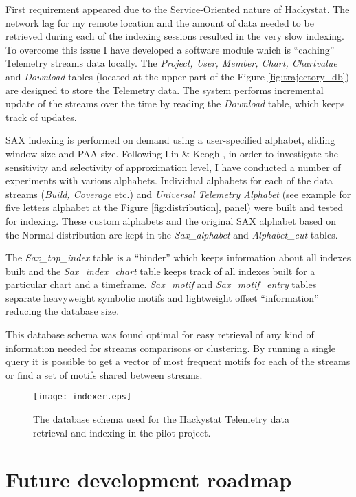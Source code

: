 First requirement appeared due to the Service-Oriented nature of Hackystat. The network lag for my remote location and the amount of data needed to be retrieved during each of the indexing sessions resulted in the very slow indexing. To overcome this issue I have developed a software module which is ``caching'' Telemetry streams data locally. The \textit{Project, User, Member, Chart, Chartvalue} and \textit{Download} tables (located at the upper part of the Figure \ref{fig:trajectory_db}) are designed to store the Telemetry data. The system performs incremental update of the streams over the time by reading the \textit{Download} table, which keeps track of updates.

SAX indexing is performed on demand using a user-specified alphabet, sliding window size and PAA size. Following Lin \& Keogh \cite{citeulike:2821475}, in order to investigate the sensitivity and selectivity of approximation level, I have conducted a number of experiments with various alphabets. Individual alphabets for each of the data streams (\textit{Build, Coverage} etc.) and \textit{Universal Telemetry Alphabet} (see example for five letters alphabet at the Figure \ref{fig:distribution}, panel) were built and tested for indexing. These custom alphabets and the original SAX alphabet based on the Normal distribution are kept in the \textit{Sax\_alphabet} and \textit{Alphabet\_cut} tables. 

The \textit{Sax\_top\_index} table is a ``binder'' which keeps information about all indexes built and the \textit{Sax\_index\_chart} table keeps track of all indexes built for a particular chart and a timeframe. \textit{Sax\_motif} and \textit{Sax\_motif\_entry} tables separate heavyweight symbolic motifs and lightweight offset ``information'' reducing the database size. 

This database schema was found optimal for easy retrieval of any kind of information needed for streams comparisons or clustering. By running a single query it is possible to get a vector of most frequent motifs for each of the streams or find a set of motifs shared between streams.

\begin{figure}[tbp]
   \centering
   \texttt{[image: indexer.eps]}
   \caption{The database schema used for the Hackystat Telemetry data retrieval and indexing in the pilot project.}
   \label{fig:indexer}
\end{figure}

\section{Future development roadmap}
